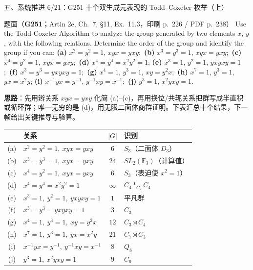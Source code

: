 \documentclass[aspectratio=169,10pt,fontset=none]{ctexbeamer}
\newcommand{\ex}[1]{\textcolor{accent}{\footnotesize\bfseries #1}}
\newcommand{\key}[1]{\textcolor{ink}{\bfseries #1}}
\begin{document}
\begin{frame}[t]{五、系统推进 6/21：G251 十个双生成元表现的 Todd–Coxeter 枚举（上）}
\label{ex:G251}
\scriptsize
\begin{block}{\footnotesize 题面（\ex{G251}；Artin 2e, Ch.~7, §11, Ex.~11.3，印刷 p.~226 / PDF p.~238）}
Use the Todd-Coxeter Algorithm to analyze the group generated by two elements $x$, $y$, with the following relations. Determine the order of the group and identify the group if you can:
\textbf{(a)} $x^2=y^2=1$, $xyx=yxy$;\ \textbf{(b)} $x^3=y^3=1$, $xyx=yxy$;\ \textbf{(c)} $x^4=y^2=1$, $xyx=yxy$;\ \textbf{(d)} $x^4=y^4=x^2y^2=1$;
\textbf{(e)} $x^3=1$, $y^2=1$, $yxyxy=1$;\ \textbf{(f)} $x^3=y^3=yxyxy=1$;\ \textbf{(g)} $x^4=1$, $y^3=1$, $xy=y^2x$;\ \textbf{(h)} $x^7=1$, $y^3=1$, $yx=x^2y$;
\textbf{(i)} $x^{-1}yx=y^{-1}$, $y^{-1}xy=x^{-1}$;\ \textbf{(j)} $y^3=1$, $x^2yxy=1$.
\end{block}
\key{思路}：先用辫关系 $xyx=yxy$ 化简 (a)--(c)，再用换位/共轭关系把群写成半直积或循环群；唯一无穷的是 (d)，用无限二面体商群证明。下表汇总十个结果，下一帧给出关键推导与验算。
\begin{center}
\renewcommand{\arraystretch}{1.18}
\begin{tabular}{@{}c l c l@{}}
\toprule
 & 关系 & $|G|$ & 识别 \\\midrule
(a) & $x^2=y^2=1,\ xyx=yxy$ & $6$ & $S_3$（二面体 $D_3$）\\
(b) & $x^3=y^3=1,\ xyx=yxy$ & $24$ & $SL_2(\mathbb F_3)$（计算值）\\
(c) & $x^4=y^2=1,\ xyx=yxy$ & $6$ & $S_3$（表迫使 $x^2=1$）\\
(d) & $x^4=y^4=x^2y^2=1$ & $\infty$ & $C_4*_{C_2}C_4$\\
(e) & $x^3=1,\ y^2=1,\ yxyxy=1$ & $1$ & 平凡群\\
(f) & $x^3=y^3=yxyxy=1$ & $3$ & $C_3$\\
(g) & $x^4=1,\ y^3=1,\ xy=y^2x$ & $12$ & $C_3\rtimes C_4$\\
(h) & $x^7=1,\ y^3=1,\ yx=x^2y$ & $21$ & $C_7\rtimes C_3$\\
(i) & $x^{-1}yx=y^{-1},\ y^{-1}xy=x^{-1}$ & $8$ & $Q_8$\\
(j) & $y^3=1,\ x^2yxy=1$ & $9$ & $C_9$\\
\bottomrule
\end{tabular}
\end{center}
\end{frame}
\end{document}
